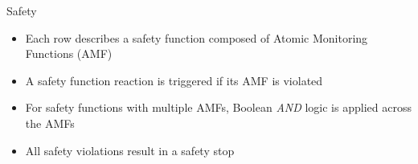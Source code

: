 \documentclass{beamer}
\begin{document}
\begin{frame}{Safety}

  \begin{block}{}
    \begin{itemize}
      \item Each row describes a safety function composed of Atomic Monitoring Functions (AMF)
      \item A safety function reaction is triggered if its AMF is violated
      \item For safety functions with multiple AMFs, Boolean \textit{AND} logic is applied across the AMFs
      \item All safety violations result in a safety stop
    \end{itemize}
  \end{block}
\end{frame}
\end{document}
